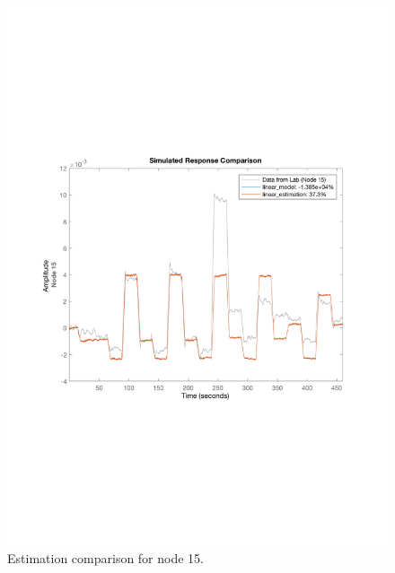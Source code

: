 \begin{figure}[H]
  \centering
  \begin{minipage}[b]{0.45\textwidth}
    \includegraphics[width=\textwidth]{report/pictures/Node15_estimation.pdf}
    \caption{Estimation comparison for node 15.}
  \end{minipage}
  \hfill
  \begin{minipage}[b]{0.45\textwidth}

\end{minipage}
\end{figure}
